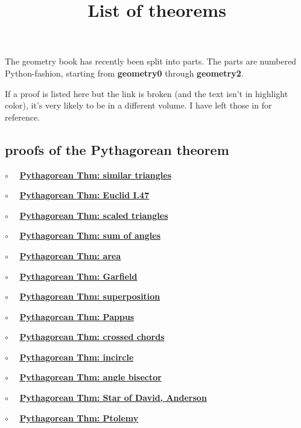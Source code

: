 \documentclass[11pt, oneside]{article}
\title{List of theorems}
\date{}
\begin{document}
\maketitle
\Large


The geometry book has recently been split into parts.  The parts are numbered Python-fashion, starting from \textbf{geometry0} through \textbf{geometry2}.

If a proof is listed here but the link is broken (and the text isn't in highlight color), it's very likely to be in a different volume.  I have left those in for reference.

\subsection*{proofs of the Pythagorean theorem}

\label{sec:list_Pythagorean_proofs}

$\circ$ \ \ \hyperref[sec:Pythagoras_similar_triangles]{\textbf{Pythagorean Thm:  similar triangles}}

$\circ$ \ \ \hyperref[sec:Euclid_I_47]{\textbf{Pythagorean Thm: Euclid I.47 }}

$\circ$ \ \ \hyperref[sec:Pythagoras_scaled_triangles]{\textbf{Pythagorean Thm:  scaled triangles}}

$\circ$ \ \ \hyperref[sec:pthm_sum_angles]{\textbf{Pythagorean Thm:  sum of angles}}

$\circ$ \ \ \hyperref[sec:Pythagoras_area]{\textbf{Pythagorean Thm:  area}}

$\circ$ \ \ \hyperref[sec:Garfield]{\textbf{Pythagorean Thm: Garfield }}

$\circ$ \ \ \hyperref[sec:PProof_Leonardo]{\textbf{Pythagorean Thm:  superposition}}

$\circ$ \ \ \hyperref[sec:PProof_Pappus]{\textbf{Pythagorean Thm:  Pappus}}

$\circ$ \ \ \hyperref[sec:PProof_chords]{\textbf{Pythagorean Thm:  crossed chords}}

$\circ$ \ \ \hyperref[sec:PProof_incircle]{\textbf{Pythagorean Thm:  incircle}}

$\circ$ \ \ \hyperref[sec:PProof_angle_bisector]{\textbf{Pythagorean Thm:  angle bisector}}

$\circ$ \ \ \hyperref[sec:star_of_david]{\textbf{Pythagorean Thm:  Star of David, Anderson}}

$\circ$ \ \ \hyperref[sec:PProof_Ptolemy]{\textbf{Pythagorean Thm: Ptolemy }}
\end{document}
